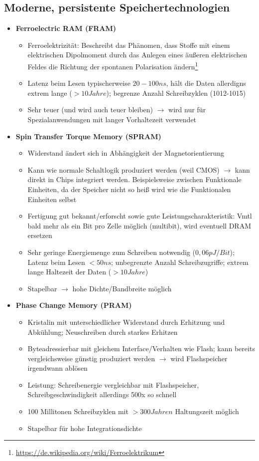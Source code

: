 \subsection{Moderne, persistente Speichertechnologien}
\begin{itemize}
	\item \textbf{Ferroelectric RAM (FRAM)}
	\begin{itemize}
		\item Ferroelektrizität: Beschreibt das Phänomen, dass Stoffe mit einem elektrischen Dipolmoment durch das Anlegen eines äußeren elektrischen Feldes die Richtung der spontanen Polarisation ändern\footnote{\url{https://de.wikipedia.org/wiki/Ferroelektrikum}}
		\item Latenz beim Lesen typischerweise \(20-100ns\), hält die Daten allerdigns extrem lange (\(>10 Jahre\)); begrenze Anzahl Schreibzyklen (1012-1015)
		\item Sehr teuer (und wird auch teuer bleiben) \(\rightarrow\) wird nur für Spezialanwendungen mit langer Vorhaltezeit verwendet
	\end{itemize}
	\item \textbf{Spin Transfer Torque Memory (SPRAM)}
	\begin{itemize}
		\item Widerstand ändert sich in Abhängigkeit der Magnetorientierung
		\item Kann wie normale Schaltlogik produziert werden (weil CMOS) \(\rightarrow\) kann direkt in Chips integriert werden. Beispielsweise zwischen Funktionale Einheiten, da der Speicher nicht so heiß wird wie die Funktionalen Einheiten selbst
		\item Fertigung gut bekannt/erforscht sowie gute Leistungscharakteristik: Vmtl bald mehr als ein Bit pro Zelle möglich (multibit), wird eventuell DRAM ersetzen
		\item Sehr geringe Energiemenge zum Schreiben notwendig (\(0,06pJ/Bit\)); Latenz beim Lesen \(< 50ns\); unbegrenzte Anzahl Schreibzugriffe; extrem lange Haltezeit der Daten (\(>10 Jahre\))
		\item Stapelbar \(\rightarrow\) hohe Dichte/Bandbreite möglich
	\end{itemize}
	\item \textbf{Phase Change Memory (PRAM)}
	\begin{itemize}
		\item Kristalin mit unterschiedlicher Widerstand durch Erhitzung und Abkühlung; Neuschreiben durch starkes Erhitzen
		\item Byteadressierbar mit gleichem Interface/Verhalten wie Flash; kann bereits vergleichsweise günstig produziert werden \(\rightarrow\) wird Flashspeicher irgendwann ablösen
		\item Leistung: Schreibenergie vergleichbar mit Flashspeicher, Schreibgeschwindigkeit allerdings 500x so schnell
		\item 100 Millitonen Schreibzyklen mit \(>300 Jahren\) Haltungszeit möglich
		\item Stapelbar für hohe Integrationsdichte
	\end{itemize}
\end{itemize}



